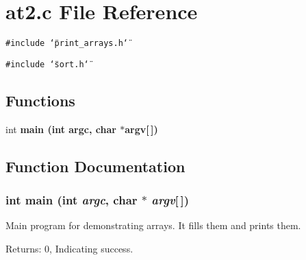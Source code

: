 \section{at2.c File Reference}
\label{at2_8c}
{\tt \#include \char`\"{}print\_\-arrays.h\char`\"{}}\par
{\tt \#include \char`\"{}sort.h\char`\"{}}\par
\subsection*{Functions}
\begin{CompactItemize}
\item 
int \bf{main} (int argc, char $\ast$argv[$\,$])
\end{CompactItemize}


\subsection{Function Documentation}
\subsubsection{\setlength{\rightskip}{0pt plus 5cm}int main (int {\em argc}, char $\ast$ {\em argv}[$\,$])}\label{at2_8c_0ddf1224851353fc92bfbff6f499fa97}


Main program for demonstrating arrays. It fills them and prints them. \begin{Desc}
\item[Returns:]0, Indicating success. \end{Desc}
